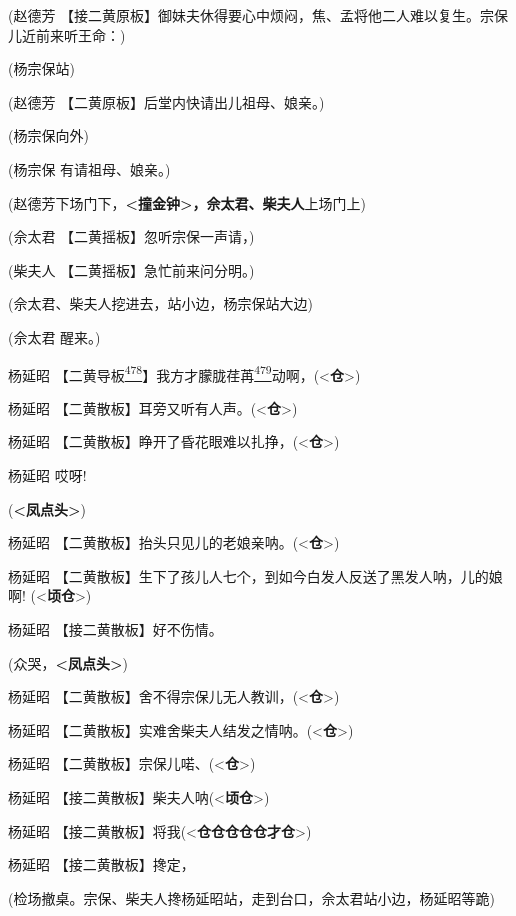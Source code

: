 (赵德芳
【接二黄原板】御妹夫休得要心中烦闷，焦、孟将他二人难以复生。宗保儿近前来听王命：)

(杨宗保站)

(赵德芳 【二黄原板】后堂内快请出儿祖母、娘亲。)

(杨宗保向外)

(杨宗保 有请祖母、娘亲。)

(赵德芳下场门下，\textbf{\textless{}撞金钟\textgreater{}，佘太君、柴夫人}上场门上)

(佘太君 【二黄摇板】忽听宗保一声请，)

(柴夫人 【二黄摇板】急忙前来问分明。)

(佘太君、柴夫人挖进去，站小边，杨宗保站大边)

(佘太君 醒来。)

杨延昭
【二黄导板\protect\hyperlink{fn478}{\textsuperscript{478}}】我方才朦胧荏苒\protect\hyperlink{fn479}{\textsuperscript{479}}动啊，(\textless{}\textbf{仓}\textgreater{})

杨延昭
【二黄散板】耳旁又听有人声。(\textless{}\textbf{仓}\textgreater{})

杨延昭
【二黄散板】睁开了昏花眼难以扎挣，(\textless{}\textbf{仓}\textgreater{})

杨延昭 哎呀!

(\textbf{\textless{}凤点头\textgreater{}})

杨延昭
【二黄散板】抬头只见儿的老娘亲呐。(\textless{}\textbf{仓}\textgreater{})

杨延昭
【二黄散板】生下了孩儿人七个，到如今白发人反送了黑发人呐，儿的娘啊!
(\textless{}\textbf{顷仓}\textgreater{})

杨延昭 【接二黄散板】好不伤情。

(众哭，\textbf{\textless{}凤点头\textgreater{}})

杨延昭
【二黄散板】舍不得宗保儿无人教训，(\textless{}\textbf{仓}\textgreater{})

杨延昭
【二黄散板】实难舍柴夫人结发之情呐。(\textless{}\textbf{仓}\textgreater{})

杨延昭 【二黄散板】宗保儿喏、(\textless{}\textbf{仓}\textgreater{})

杨延昭 【接二黄散板】柴夫人呐(\textless{}\textbf{顷仓}\textgreater{})

杨延昭
【接二黄散板】将我(\textless{}\textbf{仓仓仓仓仓才仓}\textgreater{})

杨延昭 【接二黄散板】搀定，

(检场撤桌。宗保、柴夫人搀杨延昭站，走到台口，佘太君站小边，杨延昭等跪)

